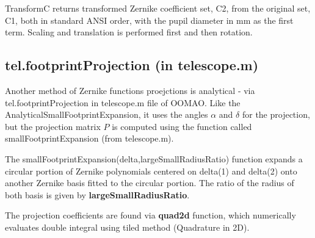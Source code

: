 \documentclass[a4paper,11pt]{book}
\begin{document}
TransformC returns transformed Zernike coefficient set, C2, from the original set, C1, 
both in standard ANSI order, with the pupil diameter in mm as the first term. Scaling and translation is performed first and then rotation.





\subsection{tel.footprintProjection (in telescope.m)}
Another method of Zernike functions proejctions is analytical - via  tel.footprintProjection in telescope.m file of OOMAO. Like the AnalyticalSmallFootprintExpansion, it uses the angles $\alpha$ and $\delta$ for the projection, but the projection matrix $P$ is computed 
using the function called smallFootprintExpansion (from telescope.m).

The smallFootprintExpansion(delta,largeSmallRadiusRatio) function  expands a circular portion of Zernike polynomials centered on
delta(1) and delta(2) onto another Zernike basis fitted to the circular portion. The ratio of the radius of both basis is given by \textbf{largeSmallRadiusRatio}.

The projection coefficients are found via \textbf{quad2d} function, which numerically evaluates double integral using tiled method (Quadrature
in 2D).
\end{document}
